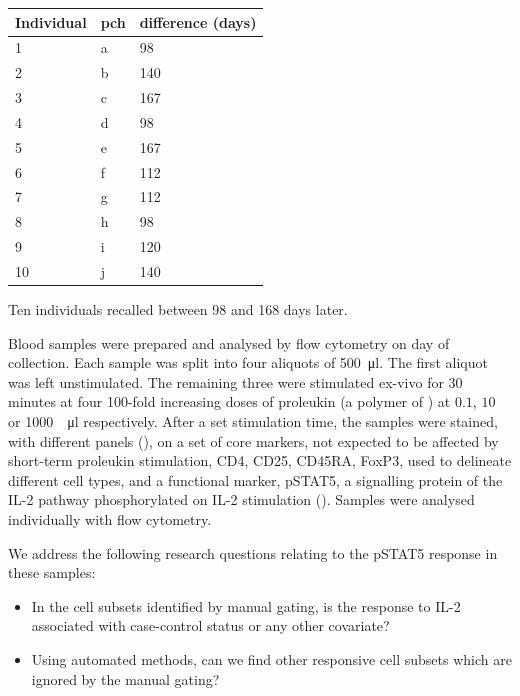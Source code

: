 \begin{table}[ht]
\centering
\begin{tabular}{lll}
  \hline
Individual &  pch & difference (days) \\
  \hline
1        &  a   & 98 \\
2        &  b   & 140 \\
3        &  c   & 167 \\
4        &  d   & 98 \\
5        &  e   & 167 \\
6        &  f   & 112 \\
7        &  g   & 112 \\
8        &  h   & 98 \\
9        &  i   & 120 \\
10       &  j   & 140 \\
   \hline
\end{tabular}
{Ten individuals recalled between 98 and 168 days later. }
{
}
\end{table}

Blood samples were prepared and analysed by flow cytometry on day of collection.
Each sample was split into four aliquots of \SI{500}{\micro\litre}.
The first aliquot was left unstimulated.
The remaining three were stimulated ex-vivo for 30 minutes at four 100-fold increasing doses
of proleukin (a polymer of ) at $0.1$, $10$ or \SI{1000}{\unit\per\micro\litre} respectively.
After a set stimulation time, the samples were stained, with different panels (), 
on a set of core markers, not expected to be affected by short-term proleukin stimulation,
CD4, CD25, CD45RA, FoxP3,
used to delineate different cell types, and a functional marker, pSTAT5, a signalling protein of the IL-2 pathway
phosphorylated on IL-2 stimulation ().
Samples were analysed individually with flow cytometry.

We address the following research questions relating to the pSTAT5 response in these samples:
\begin{itemize}
  \item In the cell subsets identified by manual gating, is the response to IL-2 associated with case-control status or any other covariate? 
  \item Using automated methods, can we find other responsive cell subsets which are ignored by the manual gating?
\end{itemize}

